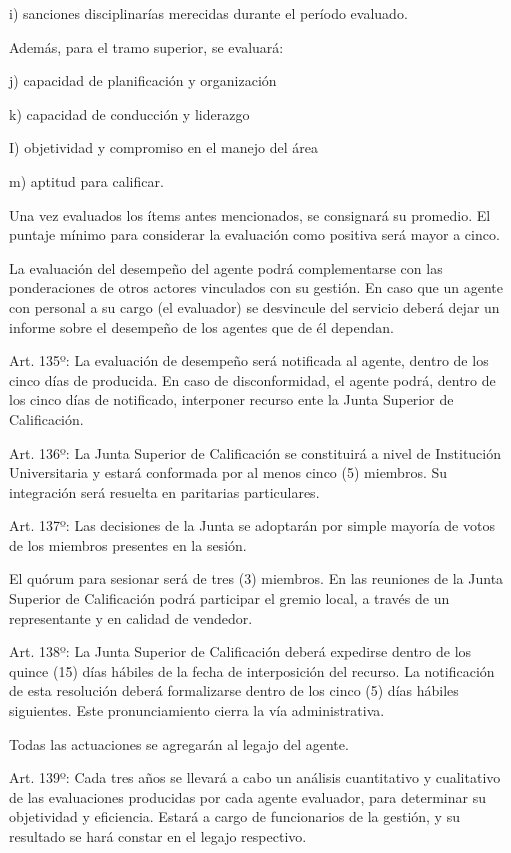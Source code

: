\documentclass[]{article}
\begin{document}
i) sanciones disciplinarías merecidas durante el período evaluado.

Además, para el tramo superior, se evaluará:

j) capacidad de planificación y organización

k) capacidad de conducción y liderazgo

I) objetividad y compromiso en el manejo del área

m) aptitud para calificar.

Una vez evaluados los ítems antes mencionados, se consignará su
promedio. El puntaje mínimo para considerar la evaluación como positiva
será mayor a cinco.

La evaluación del desempeño del agente podrá complementarse con las
ponderaciones de otros actores vinculados con su gestión. En caso que un
agente con personal a su cargo (el evaluador) se desvincule del servicio
deberá dejar un informe sobre el desempeño de los agentes que de él
dependan.

Art. 135º: La evaluación de desempeño será notificada al agente, dentro
de los cinco días de producida. En caso de disconformidad, el agente
podrá, dentro de los cinco días de notificado, interponer recurso ente
la Junta Superior de Calificación.

Art. 136º: La Junta Superior de Calificación se constituirá a nivel de
Institución Universitaria y estará conformada por al menos cinco (5)
miembros. Su integración será resuelta en paritarias particulares.

Art. 137º: Las decisiones de la Junta se adoptarán por simple mayoría de
votos de los miembros presentes en la sesión.

El quórum para sesionar será de tres (3) miembros. En las reuniones de
la Junta Superior de Calificación podrá participar el gremio local, a
través de un representante y en calidad de vendedor.

Art. 138º: La Junta Superior de Calificación deberá expedirse dentro de
los quince (15) días hábiles de la fecha de interposición del recurso.
La notificación de esta resolución deberá formalizarse dentro de los
cinco (5) días hábiles siguientes. Este pronunciamiento cierra la vía
administrativa.

Todas las actuaciones se agregarán al legajo del agente.

Art. 139º: Cada tres años se llevará a cabo un análisis cuantitativo y
cualitativo de las evaluaciones producidas por cada agente evaluador,
para determinar su objetividad y eficiencia. Estará a cargo de
funcionarios de la gestión, y su resultado se hará constar en el legajo
respectivo.
\end{document}
